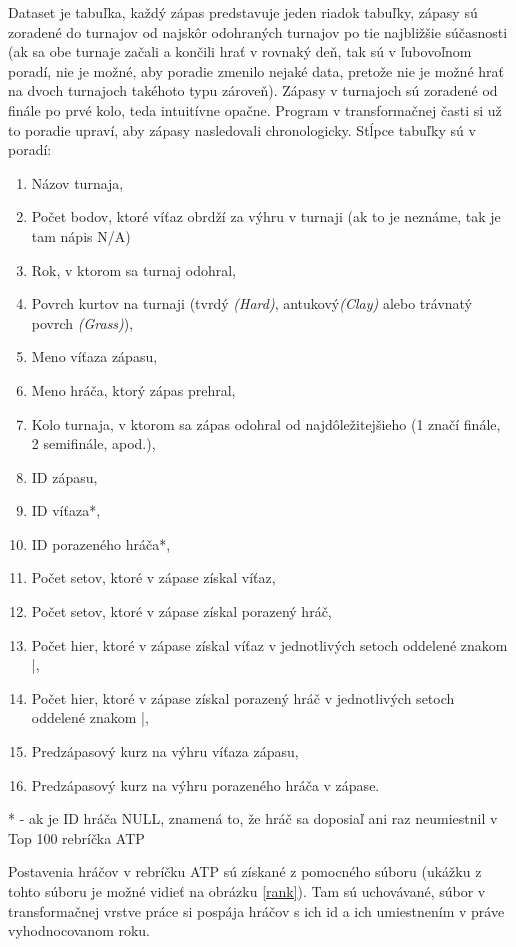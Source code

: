 Dataset je tabuľka, každý zápas predstavuje jeden riadok tabuľky, zápasy sú zoradené do turnajov od najskôr odohraných turnajov po tie najbližšie súčasnosti (ak sa obe turnaje začali a končili hrať v rovnaký deň, tak sú v ľubovoľnom poradí, nie je možné, aby poradie zmenilo nejaké data, pretože nie je možné hrať na dvoch turnajoch takéhoto typu zároveň). 
Zápasy v turnajoch sú zoradené od finále po prvé kolo, teda intuitívne opačne. Program v transformačnej časti si už to poradie upraví, aby zápasy nasledovali chronologicky. 
Stĺpce tabuľky sú v poradí:
\begin{enumerate}
  \item Názov turnaja,
  \item Počet bodov, ktoré víťaz obrdží za výhru v turnaji (ak to je neznáme, tak je tam nápis N/A)
  \item Rok, v ktorom sa turnaj odohral,
  \item Povrch kurtov na turnaji (tvrdý \textit{(Hard)}, antukový\textit{(Clay)} alebo trávnatý povrch \textit{(Grass)}),
  \item Meno víťaza zápasu,
  \item Meno hráča, ktorý zápas prehral,
  \item Kolo turnaja, v ktorom sa zápas odohral od najdôležitejšieho (1 značí finále, 2 semifinále, apod.),
  \item ID zápasu,
  \item ID víťaza*,
  \item ID porazeného hráča*,
  \item Počet setov, ktoré v zápase získal víťaz,
  \item Počet setov, ktoré v zápase získal porazený hráč,
  \item Počet hier, ktoré v zápase získal víťaz v jednotlivých setoch oddelené znakom |,
  \item Počet hier, ktoré v zápase získal porazený hráč v jednotlivých setoch oddelené znakom |,
  \item Predzápasový kurz na výhru víťaza zápasu,
  \item Predzápasový kurz na výhru porazeného hráča v zápase.
\end{enumerate}
* - ak je ID hráča NULL, znamená to, že hráč sa doposiaľ ani raz neumiestnil v Top 100 rebríčka ATP

Postavenia hráčov v rebríčku ATP sú získané z pomocného súboru (ukážku z tohto súboru je možné vidieť na obrázku \ref{rank}). Tam sú uchovávané, súbor v transformačnej vrstve práce si pospája hráčov s ich id a ich umiestnením v práve vyhodnocovanom roku.

